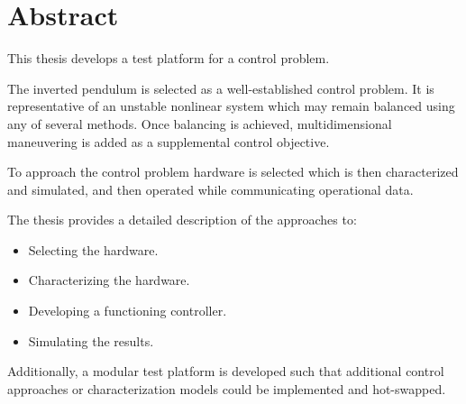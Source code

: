 \documentclass[crop=false,float=true,class=scrreprt]{standalone}
\begin{document}
\chapter*{Abstract}


This thesis develops a test platform for a control problem.

The inverted pendulum is selected as a well-established control problem.
It is representative of an unstable nonlinear system
which may remain balanced using any of several methods. 
Once balancing is achieved, 
multidimensional maneuvering is added as a supplemental control objective.

To approach the control problem hardware is selected
which is then characterized and simulated, 
and then operated while communicating operational data.

The thesis provides a detailed description of the approaches to:

\begin{itemize}[leftmargin=*]
\item Selecting the hardware.
\item Characterizing the hardware.
\item Developing a functioning controller.
\item Simulating the results.
\end{itemize}

Additionally, a modular test platform is developed 
such that additional control approaches
or characterization models could be implemented and hot-swapped.

\clearpage
\end{document}
